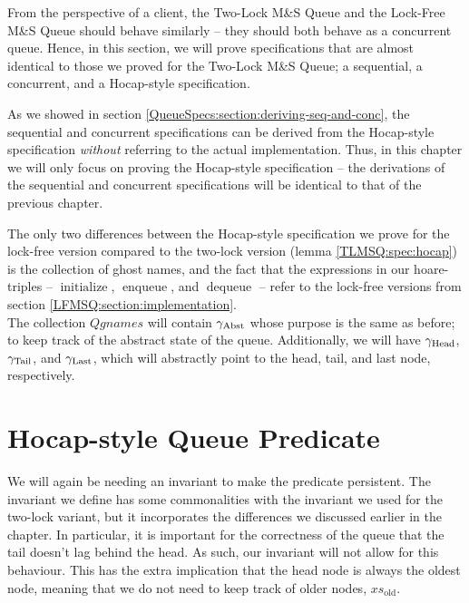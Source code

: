\documentclass[a4paper, 10pt]{report}
\theoremstyle{definition}
\newcommand{\initialise}{\operatorname{initialize}}
\newcommand{\enqueue}{\operatorname{enqueue}}
\newcommand{\dequeue}{\operatorname{dequeue}}
\newcommand{\msq}{M\&S Queue}
\newcommand{\tlmsq}{Two-Lock \msq{}}
\newcommand{\lfmsq}{Lock-Free \msq{}}
\newcommand{\Qgnames}{Qgnames}
\newcommand{\xsold}{xs_{\mathrm{old}}}
\newcommand{\gabst}{\gname_{\mathrm{Abst}}}
\newcommand{\ghead}{\gname_{\mathrm{Head}}}
\newcommand{\gtail}{\gname_{\mathrm{Tail}}}
\newcommand{\glast}{\gname_{\mathrm{Last}}}
\begin{document}
From the perspective of a client, the \tlmsq{} and the \lfmsq{} should behave similarly -- they should both behave as a concurrent queue. Hence, in this section, we will prove specifications that are almost identical to those we proved for the \tlmsq{}; a sequential, a concurrent, and a Hocap-style specification.

As we showed in section \ref{QueueSpecs:section:deriving-seq-and-conc}, the sequential and concurrent specifications can be derived from the Hocap-style specification \emph{without} referring to the actual implementation. Thus, in this chapter we will only focus on proving the Hocap-style specification -- the derivations of the sequential and concurrent specifications will be identical to that of the previous chapter.

The only two differences between the Hocap-style specification we prove for the lock-free version compared to the two-lock version (lemma \ref{TLMSQ:spec:hocap}) is the collection of ghost names, and the fact that the expressions in our hoare-triples -- $\initialise$, $\enqueue$, and $\dequeue$ -- refer to the lock-free versions from section \ref{LFMSQ:section:implementation}.\\
The collection $\Qgnames$ will contain $\gabst$ whose purpose is the same as before; to keep track of the abstract state of the queue. Additionally, we will have $\ghead$, $\gtail$, and $\glast$, which will abstractly point to the head, tail, and last node, respectively. 

\section{Hocap-style Queue Predicate}
\label{LFMSQ:section:hocap-queue-pred}

We will again be needing an invariant to make the predicate persistent. The invariant we define has some commonalities with the invariant we used for the two-lock variant, but it incorporates the differences we discussed earlier in the chapter. In particular, it is important for the correctness of the queue that the tail doesn't lag behind the head. As such, our invariant will not allow for this behaviour. This has the extra implication that the head node is always the oldest node, meaning that we do not need to keep track of older nodes, $\xsold$.
\end{document}
